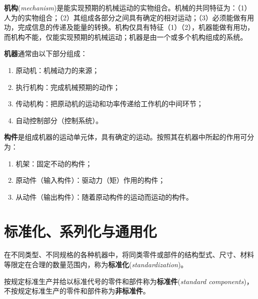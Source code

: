 \begin{definition}[机构]
\label{def:机构}
\textbf{机构}(\emph{mechanism})是能实现预期的机械运动的实物组合。机械的共同特征为：（1）人为的实物组合；（2）其组成各部分之间具有确定的相对运动；（3）必须能做有用功，完成信息的传递及能量的转换。机构仅具有特征（1）（2），机器能做有用功，而机构不能，仅能实现预期的机械运动；机器是由一个或多个机构组成的系统。
\end{definition}

\begin{definition}[机器]
\label{def:机器组成}
\textbf{机器}通常由以下部分组成：
\begin{enumerate}
	\item 原动机：机械动力的来源；
	\item 执行机构：完成机械预期的动作；
	\item 传动机构：把原动机的运动和功率传递给工作机的中间环节；
	\item 自动控制部分（控制系统）。
\end{enumerate}
\end{definition}

\begin{definition}[构件]
\label{def:构件}
\textbf{构件}是组成机器的运动单元体，具有确定的运动。按照其在机器中所起的作用可分为：
\begin{enumerate}
	\item 机架：固定不动的构件；
	\item 原动件（输入构件）：驱动力（矩）作用的构件；
	\item 从动件（输出构件）：随着原动构件的运动而运动的构件。
\end{enumerate}
\end{definition}

\section{标准化、系列化与通用化}
\label{sec:三化}

\begin{definition}[标准化]
\label{def:标准化}
在不同类型、不同规格的各种机器中，将同类零件或部件的结构型式、尺寸、材料等限定在合理的数量范围内，称为\textbf{标准化}(\emph{standardization})。
\end{definition}

\begin{definition}[标准件与非标准件]
\label{def:标准件}
按规定标准生产并给以标准代号的零件和部件称为\textbf{标准件}(\emph{standard components})，不按规定标准生产的零件和部件称为\textbf{非标准件}。
\end{definition}

